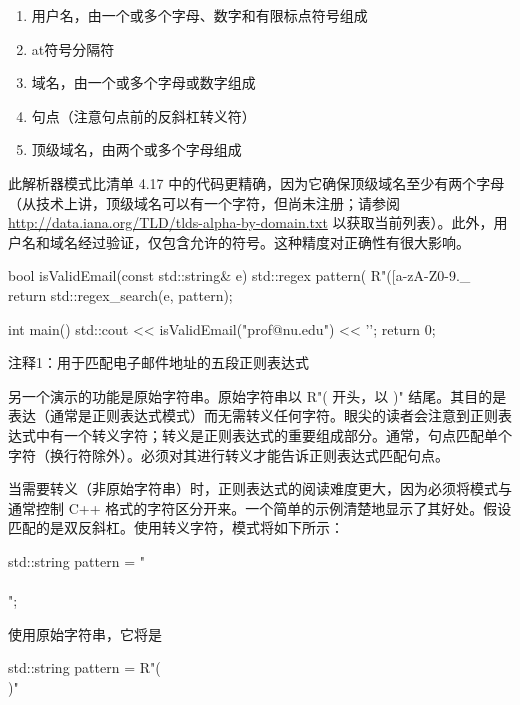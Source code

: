 \begin{enumerate}
\item
用户名，由一个或多个字母、数字和有限标点符号组成

\item
at符号分隔符

\item
域名，由一个或多个字母或数字组成

\item
句点（注意句点前的反斜杠转义符）

\item
顶级域名，由两个或多个字母组成
\end{enumerate}

此解析器模式比清单 4.17 中的代码更精确，因为它确保顶级域名至少有两个字母（从技术上讲，顶级域名可以有一个字符，但尚未注册；请参阅 \url{http://data.iana.org/TLD/tlds-alpha-by-domain.txt} 以获取当前列表）。此外，用户名和域名经过验证，仅包含允许的符号。这种精度对正确性有很大影响。


\begin{cpp}
bool isValidEmail(const std::string& e) {
  std::regex pattern(
      R"([a-zA-Z0-9._%
  return std::regex_search(e, pattern);
}

int main() {
  std::cout << isValidEmail("prof@nu.edu") << '\n';
  return 0;
}
\end{cpp}

{\footnotesize
注释1：用于匹配电子邮件地址的五段正则表达式
}

另一个演示的功能是原始字符串。原始字符串以 R"( 开头，以 )" 结尾。其目的是表达（通常是正则表达式模式）而无需转义任何字符。眼尖的读者会注意到正则表达式中有一个转义字符；转义是正则表达式的重要组成部分。通常，句点匹配单个字符（换行符除外）。必须对其进行转义才能告诉正则表达式匹配句点。

当需要转义（非原始字符串）时，正则表达式的阅读难度更大，因为必须将模式与通常控制 C++ 格式的字符区分开来。一个简单的示例清楚地显示了其好处。假设匹配的是双反斜杠。使用转义字符，模式将如下所示：

\begin{cpp}
std::string pattern = "\\\\";
\end{cpp}

使用原始字符串，它将是

\begin{cpp}
std::string pattern = R"(\\)"
\end{cpp}

